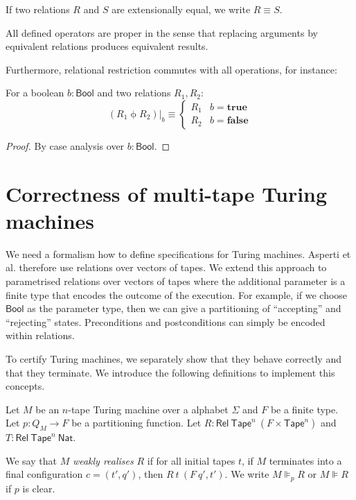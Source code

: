 \documentclass{psartcl}
\newcommand{\MS}[1]{\textsf{#1}}
\newcommand{\from}{:}
\renewcommand{\to}{\rightarrow}
\newcommand{\Bool}{\MS{Bool}}
\newcommand{\Nat}{\MS{Nat}}
\newcommand{\true}{\mathbf{true}}
\newcommand{\false}{\mathbf{false}}
\newcommand{\Tape}{\MS{Tape}}
\newcommand{\Tapes}[1]{\Tape^{#1}}
\newcommand{\rif}{\mathbin{\phi}}
\newcommand{\at}[2][]{#1|_{#2}}
\newcommand{\Rel}{\mathsf{Rel}}
\begin{document}

If two relations $R$ and $S$ are extensionally equal, we write $R \equiv S$.

All defined operators are proper in the sense that replacing arguments by equivalent relations produces equivalent results.

Furthermore, relational restriction commutes with all operations, for instance:

\begin{lemma}
  For a boolean $b:\Bool$ and two relations $R_1, R_2$:
  $$(R_1 \rif R_2)\at{b} \equiv
  \begin{cases}
    R_1 & b = \true \\
    R_2 & b = \false
  \end{cases} $$
\end{lemma}
\begin{proof}
  By case analysis over $b:\Bool$.
\end{proof}



\section{Correctness of multi-tape Turing machines}
\label{sec:verification}

We need a formalism how to define specifications for Turing machines.  Asperti et al. therefore use relations over vectors of tapes.  We extend this
approach to parametrised relations over vectors of tapes where the additional parameter is a finite type that encodes the outcome of the execution.
For example, if we choose $\Bool$ as the parameter type, then we can give a partitioning of ``accepting'' and ``rejecting'' states.  Preconditions and
postconditions can simply be encoded within relations.

To certify Turing machines, we separately show that they behave correctly and that they terminate.
We introduce the following definitions to implement this concepts.

Let $M$ be an $n$-tape Turing machine over a alphabet $\Sigma$ and $F$ be a finite type.
Let $p \from Q_M \to F$ be a partitioning function.
Let $R:\Rel~\Tapes{n}~(F \times \Tapes{n})$ and $T:\Rel~\Tapes{n}~\Nat$.

\begin{definition}
  \label{def:wrealise}
  We say that $M$ \emph{weakly realises} $R$ if for all initial tapes $t$, if $M$ terminates into a final configuration $c=(t', q')$, then
  $R~t~(F~q', t')$.
  We write $M \VDash_p R$ or $M \VDash R$ if $p$ is clear.
\end{definition}
\end{document}
